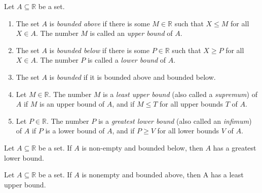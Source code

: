 \begin{definition} %
	Let $A \subseteq \mathbb{R}$ be a set.
	\begin{enumerate}
		\item The set $A$ is \emph{bounded above} if there is some $M \in \mathbb{R}$ such that $X \leq M$ for all $X \in A$. The number $M$ is called an \emph{upper bound} of $A$.
		\item The set $A$ is \emph{bounded below} if there is some $P \in \mathbb{R}$ such that $X \geq P$ for all $X \in A$. The number $P$ is called a \emph{lower bound} of $A$.
		\item The set $A$ is \emph{bounded} if it is bounded above and bounded below.
		\item Let $M \in \mathbb{R}$. The number $M$ is a \emph{least upper bound} (also called a \emph{supremum}) of $A$ if $M$ is an upper bound of $A$, and if $M \leq T$ for all upper bounds $T$ of $A$.
		\item Let $P \in \mathbb{R}$. The number $P$ is a \emph{greatest lower bound} (also called an \emph{infimum}) of $A$ if $P$ is a lower bound of $A$, and if $P \geq V$ for all lower bounds $V$ of $A$.
	\end{enumerate}
\end{definition}

\begin{theorem} %
	Let $A \subseteq \mathbb{R}$ be a set. If $A$ is non-empty and bounded below, then $A$ has a greatest lower bound.
\end{theorem}

\begin{theorem} %
	Let $A \subseteq \mathbb{R}$ be a set. If $A$ is nonempty and bounded above, then A has a least upper bound.
\end{theorem}

